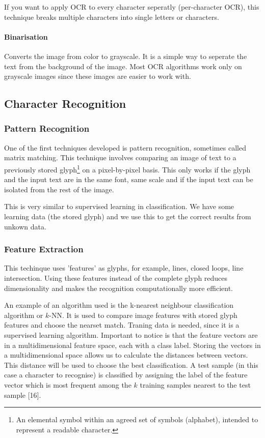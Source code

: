\documentclass[12pt]{article}
\begin{document}
If you want to apply OCR to every character seperatly (per-character OCR), this technique breaks multiple characters into single letters or characters.

\paragraph{Binarisation}

Converts the image from color to grayscale. It is a simple way to seperate the text from the background of the image. Most OCR algorithms work only on grayscale images since these images are easier to work with. 

\subsection{Character Recognition}

\subsubsection{Pattern Recognition}

One of the first techniques developed is pattern recognition, sometimes called matrix matching. This technique involves comparing an image of text to a previously stored glyph\footnote{An elemental symbol within an agreed set of symbols (alphabet), intended to represent a readable character.} on a pixel-by-pixel basis. This only works if the glyph and the input text are in the same font, same scale and if the input text can be isolated from the rest of the image.
\newline

This is very similar to supervised learning in classification. We have some learning data (the stored glyph) and we use this to get the correct results from unkown data.

\subsubsection{Feature Extraction}

This techinque uses 'features' as glyphs, for example, lines, closed loops, line intersection. Using these features instead of the complete glyph reduces dimensionality and makes the recognition computationally more efficient.
\newline

An example of an algorithm used is the k-nearest neighbour classification algorithm or $k$-NN. It is used to compare image features with stored glyph features and choose the nearset match. Traning data is needed, since it is a supervised learning algorithm. Important to notice is that the feature vectors are in a multidimensional feature space, each with a class label. Storing the vectors in a multidimensional space allows us to calculate the distances between vectors. This distance will be used to choose the best classification. A test sample (in this case a character to recognise) is classified by assigning the label of the feature vector which is most frequent among the $k$ training samples nearest to the test sample [16]. 
\newline
\end{document}
